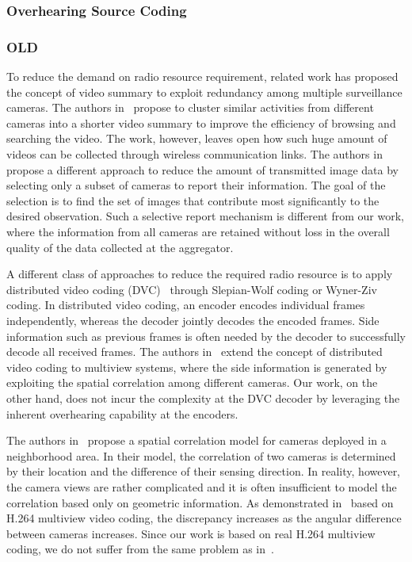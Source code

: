 \subsubsection{Overhearing Source Coding}

\subsubsection{OLD}
To reduce the demand on radio resource requirement, related work has proposed the concept of video summary to exploit redundancy among multiple surveillance cameras.
The authors in~\cite{ClusteredSynopsis} propose to cluster similar activities from different cameras into a shorter video summary to improve the efficiency of browsing and searching the video.
The work, however, leaves open how such huge amount of videos can be collected through wireless communication links.
The authors in~\cite{CameraSelection} propose a different approach to reduce the amount of transmitted image data by selecting only a subset of cameras to report their information.
The goal of the selection is to find the set of images that contribute most significantly to the desired observation.
Such a selective report mechanism is different from our work, where the information from all cameras are retained without loss in the overall quality of the data collected at the aggregator.

A different class of approaches to reduce the required radio resource is to apply distributed video coding (DVC)~\cite{DVC} through Slepian-Wolf coding or Wyner-Ziv coding.
In distributed video coding, an encoder encodes individual frames independently, whereas the decoder jointly decodes the encoded frames.
Side information such as previous frames is often needed by the decoder to successfully decode all received frames.
The authors in~\cite{DVCinMVC} extend the concept of distributed video coding to multiview systems, where the side information is generated by exploiting the spatial correlation among different cameras.
Our work, on the other hand, does not incur the complexity at the DVC decoder by leveraging the inherent overhearing capability at the encoders.

The authors in~\cite{SpatialCorrelationModel} propose a spatial correlation model for cameras deployed in a neighborhood area.
In their model, the correlation of two cameras is determined by their location and the difference of their sensing direction.
In reality, however, the camera views are rather complicated and it is often insufficient to model the correlation based only on geometric information.
As demonstrated in~\cite{RealisticModel} based on H.264 multiview video coding, the discrepancy increases as the angular difference between cameras increases.
Since our work is based on real H.264 multiview coding, we do not suffer from the same problem as in~\cite{SpatialCorrelationModel}.
%

